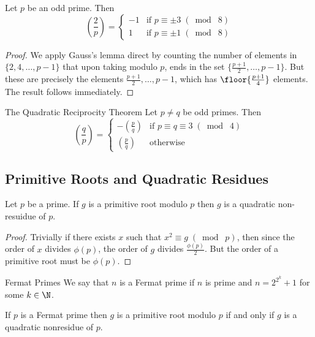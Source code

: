 \begin{lmm}{}{} Let $p$ be an odd prime. Then $$\left(\frac{2}{p}\right)=\begin{cases}
-1 & \text{if }p\equiv \pm3\;(\bmod\; 8)\\
1 & \text{if }p\equiv \pm1\;(\bmod\; 8)
\end{cases}$$ \tcbline
\begin{proof}
We apply Gauss's lemma direct by counting the number of elements in $\{2,4,\dots,p-1\}$ that upon taking modulo $p$, ends in the set $\{\frac{p+1}{2},\dots,p-1\}$. But these are precisely the elements $\frac{p+1}{2},\dots,p-1$, which has $\floor{\frac{p+1}{4}}$ elements. The result follows immediately. 
\end{proof}
\end{lmm}

\begin{thm}{The Quadratic Reciprocity Theorem}{} Let $p\neq q$ be odd primes. Then $$\left(\frac{q}{p}\right)=\begin{cases}
-\left(\frac{p}{q}\right) & \text{if }p\equiv q\equiv 3\;(\bmod\; 4)\\
\left(\frac{p}{q}\right) & \text{otherwise}
\end{cases}$$
\end{thm}

\subsection{Primitive Roots and Quadratic Residues}
\begin{prp}{}{} Let $p$ be a prime. If $g$ is a primitive root modulo $p$ then $g$ is a quadratic non-resuidue of $p$. \tcbline
\begin{proof}
Trivially if there exists $x$ such that $x^2\equiv g\;(\bmod\; p)$, then since the order of $x$ divides $\phi(p)$, the order of $g$ divides $\frac{\phi(p)}{2}$. But the order of a primitive root must be $\phi(p)$. 
\end{proof}
\end{prp}

\begin{defn}{Fermat Primes}{} We say that $n$ is a Fermat prime if $n$ is prime and $n=2^{2^k}+1$ for some $k\in\N$. 
\end{defn}

\begin{thm}{}{} If $p$ is a Fermat prime then $g$ is a primitive root modulo $p$ if and only if $g$ is a quadratic nonresidue of $p$. 
\end{thm}

